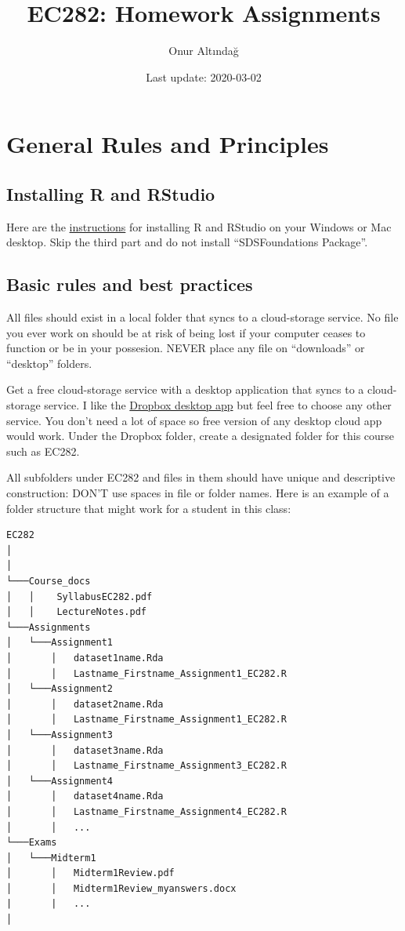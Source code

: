 \documentclass[
]{book}
\title{EC282: Homework Assignments}
\author{Onur Altındağ}
\date{Last update: 2020-03-02}
\begin{document}
\frontmatter
\maketitle

{
\setcounter{tocdepth}{1}
\tableofcontents
}
\mainmatter
\hypertarget{general-rules-and-principles}{%
\chapter{General Rules and Principles}\label{general-rules-and-principles}}

\hypertarget{installing-r-and-rstudio}{%
\section{Installing R and RStudio}\label{installing-r-and-rstudio}}

Here are the \href{https://courses.edx.org/courses/UTAustinX/UT.7.01x/3T2014/56c5437b88fa43cf828bff5371c6a924/}{instructions} for installing R and RStudio on your Windows or Mac desktop. Skip the third part and do not install ``SDSFoundations Package''.

\hypertarget{basic-rules-and-best-practices}{%
\section{Basic rules and best practices}\label{basic-rules-and-best-practices}}

All files should exist in a local folder that syncs to a cloud-storage service. No file you ever work on should be at risk of being lost if your computer ceases to function or be in your possesion. NEVER place any file on ``downloads'' or ``desktop'' folders.

Get a free cloud-storage service with a desktop application that syncs to a cloud-storage service. I like the \href{https://help.dropbox.com/installs-integrations/desktop/desktop-application-overview}{Dropbox desktop app} but feel free to choose any other service. You don't need a lot of space so free version of any desktop cloud app would work. Under the Dropbox folder, create a designated folder for this course such as EC282.

All subfolders under EC282 and files in them should have unique and descriptive construction: DON'T use spaces in file or folder names. Here is an example of a folder structure that might work for a student in this class:

\begin{verbatim}
EC282
│  
│
└───Course_docs
│   │    SyllabusEC282.pdf
│   │    LectureNotes.pdf 
└───Assignments
│   └───Assignment1
│       │   dataset1name.Rda
│       │   Lastname_Firstname_Assignment1_EC282.R
│   └───Assignment2
│       │   dataset2name.Rda
│       │   Lastname_Firstname_Assignment1_EC282.R
│   └───Assignment3
│       │   dataset3name.Rda
│       │   Lastname_Firstname_Assignment3_EC282.R
│   └───Assignment4
│       │   dataset4name.Rda
│       │   Lastname_Firstname_Assignment4_EC282.R
│       │   ...
└───Exams
│   └───Midterm1
│       │   Midterm1Review.pdf
│       │   Midterm1Review_myanswers.docx
|       |   ...
│   
\end{verbatim}
\end{document}
